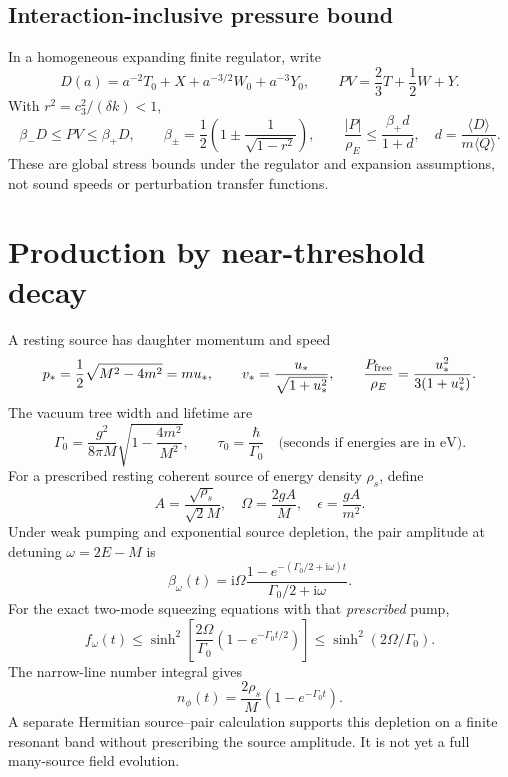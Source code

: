 \documentclass[11pt]{article}
\newcommand{\ii}{\mathrm{i}}
\begin{document}
\subsection*{Interaction-inclusive pressure bound}
In a homogeneous expanding finite regulator, write
\begin{equation}
 D(a)=a^{-2}T_0+X+a^{-3/2}W_0+a^{-3}Y_0,\qquad
 PV=\frac23T+\frac12W+Y.
\end{equation}
With $r^2=c_3^2/(\delta k)<1$,
\begin{equation}
 \beta_-D\le PV\le\beta_+D,\qquad
 \beta_\pm=\frac12\left(1\pm\frac1{\sqrt{1-r^2}}\right),\qquad
 \frac{|P|}{\rho_E}\le\frac{\beta_+d}{1+d},\quad d=\frac{\langle D\rangle}{m\langle Q\rangle}.
\end{equation}
These are global stress bounds under the regulator and expansion assumptions, not sound speeds or perturbation transfer functions.

\section{Production by near-threshold decay}
A resting source has daughter momentum and speed
\begin{equation}
 p_*=\frac12\sqrt{M^2-4m^2}=m u_*,\qquad
 v_*=\frac{u_*}{\sqrt{1+u_*^2}},\qquad
 \frac{P_{\rm free}}{\rho_E}=\frac{u_*^2}{3(1+u_*^2)}.
\end{equation}
The vacuum tree width and lifetime are
\begin{equation}
 \Gamma_0=\frac{g^2}{8\pi M}\sqrt{1-\frac{4m^2}{M^2}},\qquad
 \tau_0=\frac{\hbar}{\Gamma_0}\quad\text{(seconds if energies are in eV).}
\end{equation}
For a prescribed resting coherent source of energy density $\rho_s$, define
\begin{equation}
 A=\frac{\sqrt{\rho_s}}{\sqrt2 M},\quad
 \Omega=\frac{2gA}{M},\quad \epsilon=\frac{gA}{m^2}.
\end{equation}
Under weak pumping and exponential source depletion, the pair amplitude at detuning $\omega=2E-M$ is
\begin{equation}
 \beta_\omega(t)=\ii\Omega\frac{1-e^{-(\Gamma_0/2+\ii\omega)t}}{\Gamma_0/2+\ii\omega}.
\end{equation}
For the exact two-mode squeezing equations with that \emph{prescribed} pump,
\begin{equation}
 f_\omega(t)\le\sinh^2\!\left[\frac{2\Omega}{\Gamma_0}(1-e^{-\Gamma_0t/2})\right]
 \le\sinh^2(2\Omega/\Gamma_0).
\end{equation}
The narrow-line number integral gives
\begin{equation}
 n_\phi(t)=\frac{2\rho_s}{M}(1-e^{-\Gamma_0t}).
\end{equation}
A separate Hermitian source--pair calculation supports this depletion on a finite resonant band without prescribing the source amplitude. It is not yet a full many-source field evolution.
\end{document}
